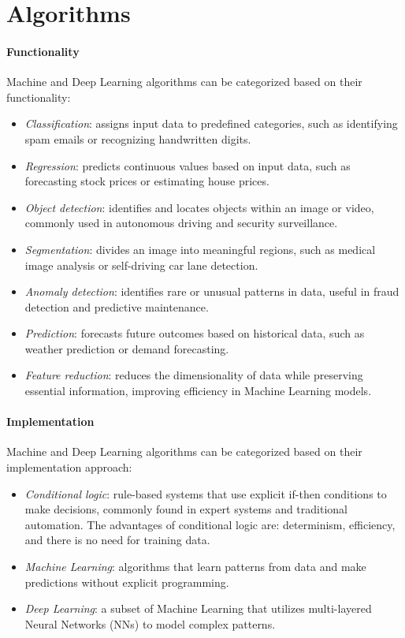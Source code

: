 \section{Algorithms}

\paragraph*{Functionality}
Machine and Deep Learning algorithms can be categorized based on their functionality:  
\begin{itemize}
    \item \textit{Classification}: assigns input data to predefined categories, such as identifying spam emails or recognizing handwritten digits.
    \item \textit{Regression}: predicts continuous values based on input data, such as forecasting stock prices or estimating house prices.
    \item \textit{Object detection}: identifies and locates objects within an image or video, commonly used in autonomous driving and security surveillance.
    \item \textit{Segmentation}: divides an image into meaningful regions, such as medical image analysis or self-driving car lane detection.
    \item \textit{Anomaly detection}: identifies rare or unusual patterns in data, useful in fraud detection and predictive maintenance.
    \item \textit{Prediction}: forecasts future outcomes based on historical data, such as weather prediction or demand forecasting.
    \item \textit{Feature reduction}: reduces the dimensionality of data while preserving essential information, improving efficiency in Machine Learning models.
\end{itemize}

\paragraph*{Implementation}
Machine and Deep Learning algorithms can be categorized based on their implementation approach:  
\begin{itemize}
    \item \textit{Conditional logic}: rule-based systems that use explicit if-then conditions to make decisions, commonly found in expert systems and traditional automation.
        The advantages of conditional logic are: determinism, efficiency, and there is no need for training data. 
    \item \textit{Machine Learning}: algorithms that learn patterns from data and make predictions without explicit programming.
    \item \textit{Deep Learning}: a subset of Machine Learning that utilizes multi-layered Neural Networks (NNs) to model complex patterns.
\end{itemize}

